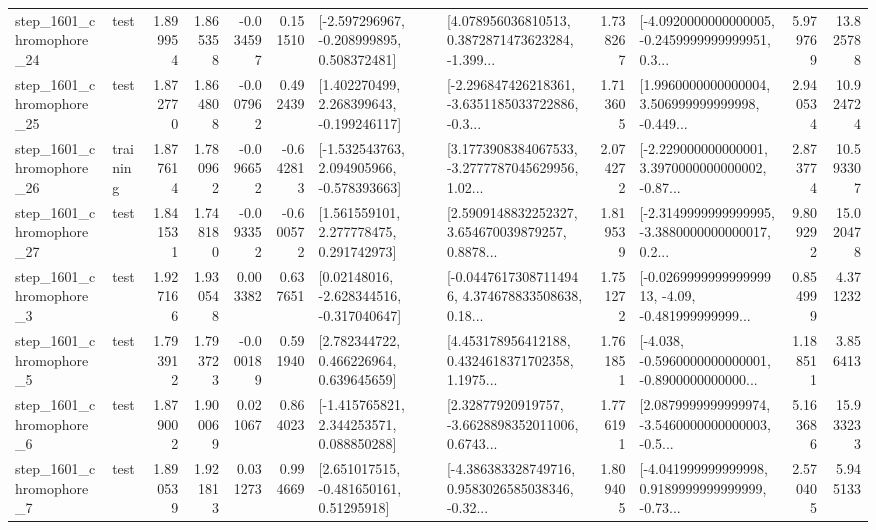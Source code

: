 \begin{tabular}{llrrrrllrlrr}
 step\_1601\_chromophore\_24 &      test &      1.899954 &    1.865358 &     -0.034597 &  0.151510 &   [-2.597296967, -0.208999895, 0.508372481] &  [4.078956036810513, 0.3872871473623284, -1.399... &       1.738267 &  [-4.0920000000000005, -0.2459999999999951, 0.3... &            5.979769 &         13.825788 \\
 step\_1601\_chromophore\_25 &      test &      1.872770 &    1.864808 &     -0.007962 &  0.492439 &    [1.402270499, 2.268399643, -0.199246117] &  [-2.296847426218361, -3.6351185033722886, -0.3... &       1.713605 &  [1.9960000000000004, 3.506999999999998, -0.449... &            2.940534 &         10.924724 \\
 step\_1601\_chromophore\_26 &  training &      1.877614 &    1.780962 &     -0.096652 & -0.642813 &   [-1.532543763, 2.094905966, -0.578393663] &  [3.1773908384067533, -3.2777787045629956, 1.02... &       2.074272 &  [-2.229000000000001, 3.3970000000000002, -0.87... &            2.873774 &         10.593307 \\
 step\_1601\_chromophore\_27 &      test &      1.841531 &    1.748180 &     -0.093352 & -0.600572 &     [1.561559101, 2.277778475, 0.291742973] &  [2.5909148832252327, 3.654670039879257, 0.8878... &       1.819539 &  [-2.3149999999999995, -3.3880000000000017, 0.2... &            9.809292 &         15.020478 \\
  step\_1601\_chromophore\_3 &      test &      1.927166 &    1.930548 &      0.003382 &  0.637651 &    [0.02148016, -2.628344516, -0.317040647] &  [-0.04476173087114946, 4.374678833508638, 0.18... &       1.751272 &  [-0.026999999999999913, -4.09, -0.481999999999... &            0.854999 &          4.371232 \\
  step\_1601\_chromophore\_5 &      test &      1.793912 &    1.793723 &     -0.000189 &  0.591940 &     [2.782344722, 0.466226964, 0.639645659] &  [4.453178956412188, 0.4324618371702358, 1.1975... &       1.761851 &  [-4.038, -0.5960000000000001, -0.8900000000000... &            1.188511 &          3.856413 \\
  step\_1601\_chromophore\_6 &      test &      1.879002 &    1.900069 &      0.021067 &  0.864023 &    [-1.415765821, 2.344253571, 0.088850288] &  [2.32877920919757, -3.6628898352011006, 0.6743... &       1.776191 &  [2.0879999999999974, -3.5460000000000003, -0.5... &            5.163686 &         15.933233 \\
  step\_1601\_chromophore\_7 &      test &      1.890539 &    1.921813 &      0.031273 &  0.994669 &     [2.651017515, -0.481650161, 0.51295918] &  [-4.386383328749716, 0.9583026585038346, -0.32... &       1.809405 &  [-4.041999999999998, 0.9189999999999999, -0.73... &            2.570405 &          5.945133 \\

\end{tabular}
